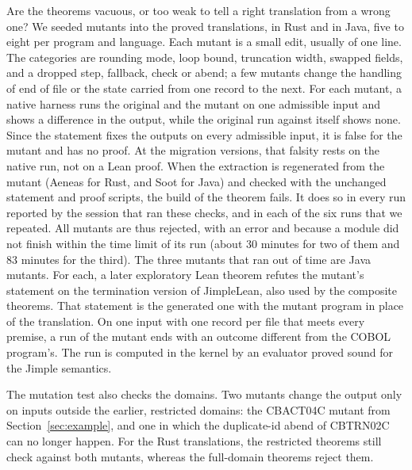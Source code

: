 Are the theorems vacuous, or too weak to tell a right translation from a wrong one? We seeded \aMutants{} mutants into
the proved translations, \aMutantsRust{} in Rust and \aMutantsJava{} in Java, five to eight per program and language.
Each mutant is a small edit, usually of one line. The categories are rounding mode, loop bound, truncation width,
swapped fields, and a dropped step, fallback, check or abend; a few mutants change the handling of end of file or the
state carried from one record to the next. For each mutant, a native harness runs the original and the mutant on one
admissible input and shows a difference in the output, while the original run against itself shows none. Since the
statement fixes the outputs on every admissible input, it is false for the mutant and has no proof. At the migration versions, that falsity rests on the native run, not on a Lean proof. When the extraction is
regenerated from the mutant (Aeneas for Rust,  and Soot for Java) and checked with the unchanged statement
and proof scripts, the build of the theorem fails. It does so in every run reported by the session that ran these checks, and in each
of the six runs that we repeated. All \aMutants{} mutants are thus rejected, \aMutantsErr{} with an error and \aMutantsTimeout{} because a module did not
finish within the time limit of its run (about 30 minutes for two of them and 83 minutes
for the third). The three mutants that ran out of time are Java mutants. For each, a later exploratory Lean theorem refutes
the mutant's statement on the termination version of JimpleLean, also used by the composite theorems. That statement
is the generated one with the mutant program in place of the translation. On one input with one record per file that meets every premise, a run of the mutant ends with an outcome different
from the COBOL program's. The run is computed in the kernel by an evaluator proved sound for the Jimple
semantics.

The mutation test also checks the domains. Two mutants change the output only on inputs outside the earlier,
restricted domains: the CBACT04C mutant from Section~\ref{sec:example}, and one in which the duplicate-id abend of
CBTRN02C can no longer happen. For the Rust translations, the restricted theorems still check against both mutants,
whereas the full-domain theorems reject them.
